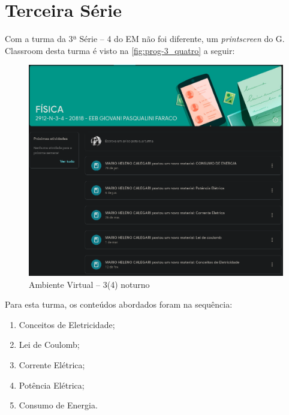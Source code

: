 \section{Terceira Série} %
\label{sec:Terceiro Série}
Com a turma da 3ª Série -- 4 do \ac{EM} não foi diferente, um \textit{printscreen} do G. Classroom desta turma é visto na \autoref{fig:prog-3_quatro} a seguir:
\vspace{10pt}
\begin{figure}[!ht]
	\centering
	\caption{Ambiente Virtual -- 3(4) noturno}
	\label{fig:prog-3_quatro}
	\includegraphics[width=.8\linewidth]{assets/conteudo_programatico-3.png}
\end{figure}

\noindent Para esta turma, os conteúdos abordados foram na sequência:
\begin{enumerate}
	\item Conceitos de Eletricidade;
	\item Lei de Coulomb;
	\item Corrente Elétrica;
	\item Potência Elétrica;
	\item Consumo de Energia.
\end{enumerate}


